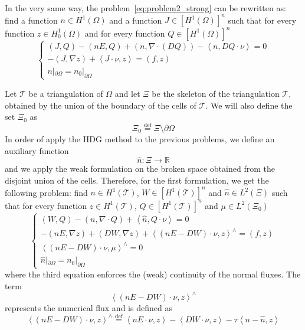 \documentclass[a4paper,11pt, draft]{article}
\newcommand{\Def}{\stackrel{\mathrm{def}}{=}}
\begin{document}
In the very same way, the problem~\ref{eq:problem2_strong} can be rewritten as: find a function $n 
\in H^1(\Omega)$ and a function $J \in [H^1(\Omega)]^n$ such that for every function \mbox{$z \in 
H^1_0(\Omega)$} and for every function $Q \in [H^1(\Omega)]^n$
\begin{equation} \label{eq:problem2_weak}
\begin{cases}
 (J, Q) - (n E, Q) + (n, \nabla \cdot (D Q)) - \left<n, DQ \cdot \nu \right> = 0 \\
 - (J, \nabla z) + \left<J \cdot \nu, z \right> = (f, z) \\
   n|_{\partial \Omega} = n_0 |_{\partial \Omega}
\end{cases}
\end{equation}


Let $\mathcal{T}$ be a triangulation of $\Omega$ and let $\Xi$ be the skeleton of the triangulation 
$\mathcal{T}$, obtained by the union of the boundary of the cells of $\mathcal{T}$. We will also 
define the set $\Xi_0$ as
\[ \Xi_0 \Def \Xi \setminus \partial \Omega \]
In order of 
apply the HDG method to the previous problems, we define an auxiliary function 
\[
  \widehat{n} \colon \Xi \longrightarrow \mathbb{R}
\]
and we apply the weak formulation on the broken space obtained from the disjoint union of the cells.
Therefore, for the first formulation, we get the following problem: find $n \in H^1(\mathcal{T})$, 
$W \in [H^1(\mathcal{T})]^n$ and $\widehat{n} \in L^2(\Xi)$ such that for every function $z \in 
H^1(\mathcal{T})$, $Q \in [H^1(\mathcal{T})]^n$ and $\mu \in L^2(\Xi_0)$
\begin{equation}\label{eq:problem1_hdg}
 \begin{cases}
   (W, Q) - (n, \nabla \cdot Q) + \left<\widehat{n}, Q \cdot \nu \right> = 0 \\
  - (n E, \nabla z) + (D W, \nabla z) + \left<(n E - D W) \cdot \nu, z\right>^{\wedge} = (f, z) \\
  \left<(n E - D W) \cdot \nu, \mu \right>^{\wedge} = 0 \\
  \widehat{n}|_{\partial \Omega} = n_0 |_{\partial \Omega}
 \end{cases}
\end{equation}
where the third equation enforces the (weak) continuity of the normal fluxes. The term
\[ \left<(n E - D W) \cdot \nu, z\right>^{\wedge} \]
represents the numerical flux and is defined as
\[ \left<(n E - D W) \cdot \nu, z\right>^{\wedge} \Def \left<nE \cdot \nu , z\right> - \left< 
D W \cdot \nu, z\right> - \tau \left< n - \widehat{n}, z\right> \]
\end{document}
